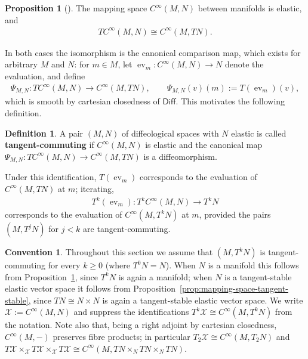 \documentclass{amsart}
\newcommand{\X}{\mathcal{X}}
\DeclareMathOperator{\evl}{ev}
\theoremstyle{definition}
\newtheorem{defn}[thm]{Definition}
\newtheorem{prop}[thm]{Proposition}
\newtheorem{convention}[thm]{Convention}
\begin{document}
\begin{prop}[{\cite[Corollary~5.9]{B23}}]\label{prop:mapping-space-manifolds}
  The mapping space $C^\infty(M, N)$ between manifolds is elastic, and
  \begin{align*}
    TC^\infty(M, N) \cong C^\infty(M, TN).
  \end{align*}
\end{prop}

In both cases the isomorphism is the canonical comparison map, which exists
for arbitrary $M$ and $N$: for $m \in M$, let
$\evl_m \colon C^\infty(M, N) \to N$ denote the evaluation, and define
\begin{align*}
  \Psi_{M, N} \colon TC^\infty(M, N) \longrightarrow C^\infty(M, TN),
  \qquad
  \Psi_{M, N}(v)(m) := T(\evl_m)(v),
\end{align*}
which is smooth by cartesian closedness of $\mathsf{Diff}$.
This motivates the following definition.

\begin{defn}\label{def:tangent-commuting}
A pair $(M, N)$ of diffeological spaces with $N$ elastic is called
\textbf{tangent-commuting} if $C^\infty(M, N)$ is elastic and the canonical map
$\Psi_{M, N} \colon TC^\infty(M, N) \to C^\infty(M, TN)$ is a diffeomorphism.
\end{defn}

Under this identification, $T(\evl_m)$ corresponds to the evaluation of
$C^\infty(M, TN)$ at $m$; iterating,
\begin{align*}
   T^k(\evl_m) \colon T^kC^\infty(M, N) \to T^kN
\end{align*}
corresponds to the evaluation of $C^\infty(M, T^kN)$ at $m$,
provided the pairs $(M, T^jN)$ for $j < k$ are tangent-commuting.

\begin{convention}\label{conv:hereditarily-tc}
  Throughout this section we assume that $(M, T^kN)$ is tangent-commuting for every $k \geq 0$ (where $T^0N = N$). When $N$ is a manifold this follows from Proposition~\ref{prop:mapping-space-manifolds}, since $T^kN$ is again a manifold; when $N$ is a tangent-stable elastic vector space it follows from Proposition~\ref{prop:mapping-space-tangent-stable}, since $TN \cong N \times N$ is again a tangent-stable elastic vector space.
  We write $\X := C^\infty(M, N)$ and suppress the identifications $T^k\X \cong C^\infty(M, T^kN)$ from the notation. Note also that, being a right adjoint by cartesian closedness, $C^\infty(M, -)$ preserves fibre products; in particular $T_2\X \cong C^\infty(M, T_2N)$ and $T\X \times_{\X} T\X \times_{\X} T\X \cong C^\infty(M, TN \times_N TN \times_N TN)$.
\end{convention}
\end{document}
